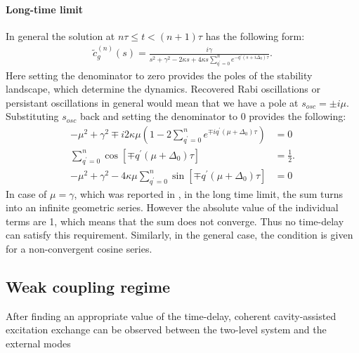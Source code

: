 \documentclass[%
 reprint,
 amsmath,amssymb,
pra,
]{revtex4-1}
\def\qp{{q^\prime}}
\def\qp{{q^\prime}}
\def\kappap{{\kappa^\prime}}
\def\ctil{\tilde{c}}
\newcommand{\lsz}{\left[}
\newcommand{\rsz}{\right]}
\newcommand{\lk}{\left(}
\newcommand{\rk}{\right)}
\begin{document}
\paragraph{Long-time limit}
In general the solution at $n\tau\le t<(n+1)\tau$ has the following form:
\begin{align}
\ctil_g^{(n)}(s) = \frac{i\gamma}{s^2+\gamma^2-2\kappa s+4\kappa s\sum_{\qp=0}^{n}e^{-\qp(s+i\Delta_0)\tau}}.
\end{align}
Here setting the denominator to zero provides the poles of the stability landscape, which determine the dynamics. Recovered Rabi oscillations or persistant oscillations in general would mean that we have a pole at $s_{osc}=\pm i\mu$. Substituting $s_{osc}$ back and setting the denominator to 0 provides the following:
\vspace{-.4cm}
\begin{align}
-\mu^2+\gamma^2\mp i2\kappa \mu\lk 1-2\sum_{\qp=0}^{n}e^{\mp i\qp(\mu+\Delta_0)\tau}\rk&=0\\
\sum_{\qp=0}^n \cos{\lsz\mp \qp(\mu+\Delta_0)\tau\rsz} &= \frac{1}{2}.\\
-\mu^2+\gamma^2-4\kappa\mu\sum_{\qp=0}^n \sin{\lsz\mp \qp(\mu+\Delta_0)\tau\rsz}&=0
\end{align}
In case of $\mu=\gamma$, which was reported in \cite{Kabuss2015}, in the long time limit, the sum turns into an infinite geometric series. However the absolute value of the individual terms are 1, which means that the sum does not converge. Thus no time-delay can satisfy this requirement. Similarly, in the general case, the condition is given for a non-convergent cosine series.

\subsection{Weak coupling regime}

After finding an appropriate value of the time-delay, coherent cavity-assisted excitation exchange can be observed between the two-level system and the external modes
\end{document}
